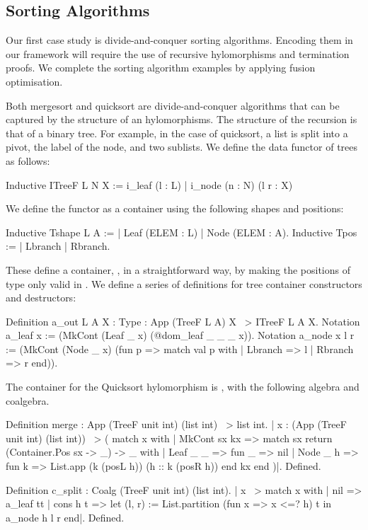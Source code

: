 \documentclass[ a4paper, UKenglish, cleveref, autoref, thm-restate]{lipics-v2021}
\newcommand{\mpav}[1]{\textcolor{red}{\textsc{Marco}: #1}}
\begin{document}
\subsection{Sorting Algorithms}\label{sec:sorting}
Our first case study is divide-and-conquer sorting algorithms.  Encoding them
in our framework will require the use of recursive hylomorphisms and
termination proofs.  We complete the sorting algorithm examples by applying
fusion optimisation.

Both mergesort and quicksort are divide-and-conquer algorithms that can be
captured by the structure of an hylomorphisms. The structure of the recursion
is that of a binary tree.  For example, in the case of quicksort, a list is
split into a pivot, the label of the node, and two sublists. We define the data
functor of trees as follows:
\begin{coqcode}
Inductive ITreeF L N X := i_leaf (l : L) | i_node (n : N) (l r : X)
\end{coqcode}
We define the functor as a container using the following shapes and positions:
\begin{coqcode}
Inductive Tshape L A := | Leaf (ELEM : L) | Node (ELEM : A).
Inductive Tpos := | Lbranch | Rbranch. 
\end{coqcode}
These define a container, , in a straightforward way, by making
the positions of type  only valid in .
We define a series of definitions for tree container constructors and 
destructors:
\begin{coqcode}
Definition a_out {L A X : Type} : App (TreeF L A) X ~> ITreeF L A X.
Notation a_leaf x := (MkCont (Leaf _ x) (@dom_leaf _ _ _ x)).
Notation a_node x l r := (MkCont (Node _ x)
  (fun p => match val p with | Lbranch => l | Rbranch => r end)).
\end{coqcode}
The container for the Quicksort hylomorphism is , with
the following algebra and coalgebra.
\begin{coqcode}
  Definition merge : App (TreeF unit int) (list int) ~> list int.
|{ x : (App (TreeF unit int) (list int)) ~> (
           match x with
           | MkCont sx kx =>
               match sx return (Container.Pos sx -> _) -> _ with
               | Leaf _ _ => fun _ => nil
               | Node _ h => fun k => List.app (k (posL h)) (h :: k (posR h))
               end kx
           end
  )}|.
Defined.

Definition c_split : Coalg (TreeF unit int) (list int).
|{ x ~> match x with
        | nil => a_leaf tt
        | cons h t => let (l, r) := List.partition (fun x => x <=? h) t in
                      a_node h l r
        end}|.
Defined.
\end{coqcode}
\end{document}
